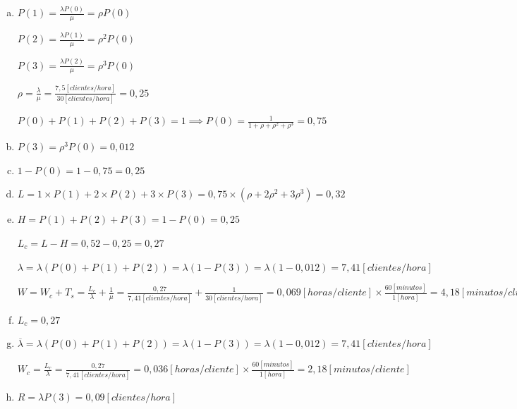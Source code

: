 \documentclass[a4paper,11pt]{article}
\begin{document}
\vspace{13pt}
\leftskip=36pt
\parindent=-18pt
\begin{enumerate}[a)]
  \item 
    $P(1) = \frac{\lambda P(0)}{\mu} = \rho P(0)$ 

    $P(2) = \frac{\lambda P(1)}{\mu} = \rho^2P(0)$ 

    $P(3) = \frac{\lambda P(2)}{\mu} = \rho^3P(0)$ 

    $\rho = \frac{\lambda}{\mu} = \frac{7,5[clientes/hora]}{30[clientes/hora]}
    = 0,25$

    $P(0) + P(1) + P(2) +P(3) = 1 \implies P(0) =
    \frac{1}{1+\rho+\rho^2+\rho^3} = 0,75$
   

  \vspace{13pt}
  \item
    $P(3) = \rho^3P(0) = 0,012$ 

  \vspace{13pt}
  \item
    $1-P(0) = 1-0,75 = 0,25$ 

  \vspace{13pt}
  \item
    $L = 1 \times P(1) + 2 \times P(2) + 3 \times P(3) = 0,75
    \times(\rho+2\rho^2+3\rho^3) = 0,32$ 

  \vspace{13pt}
  \item
    $H = P(1) + P(2) + P(3) = 1 - P(0) = 0,25$ 

    $L_c = L - H = 0,52 - 0,25 = 0,27$ 

    $\lambda = \lambda(P(0) + P(1) + P(2)) = \lambda(1-P(3)) = \lambda(1-0,012)
    = 7,41 [clientes/hora]$ 

    $W = W_c + T_s = \frac{L_c}{\lambda} + \frac{1}{\mu} =
    \frac{0,27}{7,41[clientes/hora]} + \frac{1}{30[clientes/hora]} =
    0,069[horas/cliente] \times \frac{60[minutos]}{1[hora]} =
    4,18[minutos/cliente]$

  \item
    $L_c = 0,27$

  \item
    $\overline{\lambda} = \lambda(P(0) + P(1) + P(2)) = \lambda(1-P(3)) =
    \lambda(1-0,012) = 7,41[clientes/hora]$

    $W_c = \frac{L_c}{\lambda} = \frac{0,27}{7,41[clientes/hora]} =
    0,036[horas/cliente] \times \frac{60[minutos]}{1[hora]} =
    2,18[minutos/cliente]$

  \item
    $R = \lambda P(3) = 0,09[clientes/hora]$
\end{enumerate}
\end{document}

